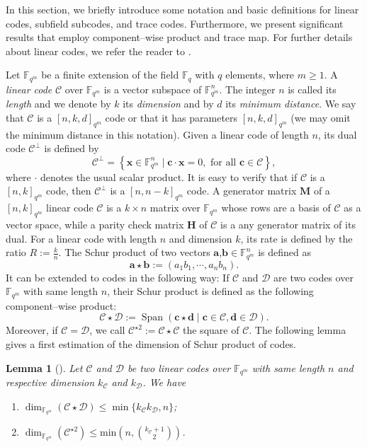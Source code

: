 \documentclass[a4paper]{amsart}
\newtheorem{lemma}[thm]{Lemma}
\theoremstyle{definition}
\theoremstyle{remark}
\newcommand{\calC}{\mathcal{C}}
\newcommand{\calD}{\mathcal{D}}
\newcommand{\fqm}{\mathbb{F}_{q^m}}
\newcommand{\fq}{\mathbb{F}_{q}}
\newcommand{\Span}[1]{\operatorname{Span}\left(#1\right)}
\begin{document}
In this section, we briefly introduce some notation and basic definitions for linear codes, subfield subcodes, and trace codes. Furthermore, we present significant results that employ component--wise product and trace map. For further details about linear codes, we refer the reader to \cite{MS86}.

\noindent Let $\fqm$ be a finite extension of the field $\fq$ with $q$ elements, where $m \geq 1$. A \emph{linear code} $\calC$ over $\fqm$ is a vector subspace of $\fqm^n$. The integer $n$ is called its \emph{length} and we denote by $k$ its \emph{dimension} and by $d$ its \emph{minimum distance}. We say that $\calC$ is a $[n,k,d]_{q^m}$ code or that it has parameters $[n,k,d]_{q^m}$ (we may omit the minimum distance in this notation). Given a linear code of length $n$, its dual code $\calC^{\perp}$ is defined by 
\[\calC^{\perp}=\left\lbrace \mathbf{x} \in \fqm^n \mid \mathbf{c} \cdot \mathbf{x}=0, \text{ for all } \mathbf{c} \in \calC \right\rbrace,\]  
where $\cdot$ denotes the usual scalar product. It is easy to verify that if $\calC$ is a $[n,k]_{q^m}$ code, then $\calC^{\perp}$ is a $[n,n-k]_{q^m}$ code.
A generator matrix $\mathbf{M}$ of a $[n,k]_{q^m}$ linear code $\calC$ is a $k \times n$ matrix over $\fqm$ whose rows are a basis of $\calC$ as a vector space, while a parity check matrix $\mathbf{H}$ of $\calC$ is a any generator matrix of its dual.
For a linear code with length $n$ and dimension $k$, its rate is defined by the ratio $R := \frac{k}{n}$.
The Schur product of two vectors $\mathbf{a}$,$\mathbf{b} \in \fqm^n$ is defined as 
\[ \mathbf{a} \star \mathbf{b} := (a_1b_1,\cdots,a_nb_n). \]
It can be extended to codes in the following way: If $\calC$ and $\calD$ are two codes over $\fqm$ with same length $n$, their Schur product is defined as the following component--wise product:
\[ \calC \star \calD := \Span{\mathbf{c} \star \mathbf{d} \mid \mathbf{c} \in \calC, \mathbf{d} \in \calD}. \]
Moreover, if $\calC = \calD$, we call $\calC^{\star 2} := \calC \star \calC$ the square of $\calC$. The following lemma gives a first estimation of the dimension of Schur product of codes.

\begin{lemma}[{\cite[Proposition~10]{MT21}}] \label{lem:known_bounds}
Let $\calC$ and $\calD$ be two linear codes over $\fqm$ with same length $n$ and respective dimension $k_{\calC}$ and $k_{\calD}$. We have
\begin{enumerate}
 \item $\dim_{\fqm}(\calC \star \calD) \leq \min\{k_{\calC}k_{\calD},n\}$;
 \item $\displaystyle \dim_{\mathbb{F}_{q^m}}(\calC^{\star2}) \leq \mathrm{min}\left(n,\binom{k_{\calC}+1}{2}\right)$.
 \end{enumerate}
\end{lemma}
\end{document}
